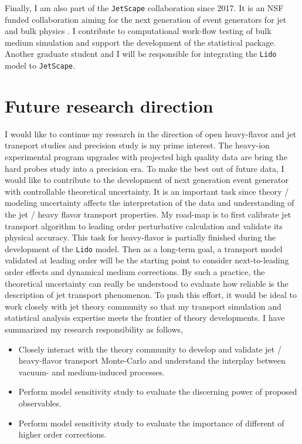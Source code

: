 \documentclass[12pt,a4paper]{revtex4-1}
\begin{document}
Finally, I am also part of the {\tt JetScape} collaboration since 2017. 
It is an NSF funded collaboration aiming for the next generation of event generators for jet and bulk physics \cite{JetScape}. 
I contribute to computational work-flow testing of bulk medium simulation and support the development of the statistical package.
Another graduate student and I will be responsible for integrating the {\tt Lido} model to {\tt JetScape}.

\section*{Future research direction}
I would like to continue my research in the direction of open heavy-flavor and jet transport studies and precision study is my prime interest. 
The heavy-ion experimental program upgrades with projected high quality data are bring the hard probes study into a precision era. 
To make the best out of future data, I would like to contribute to the development of next generation event generator with controllable theoretical uncertainty.
It is an important task since theory / modeling uncertainty affects the interpretation of the data and understanding of the jet / heavy flavor transport properties.
My road-map is to first calibrate jet transport algorithm to leading order perturbative calculation and validate its physical accuracy. 
This task for heavy-flavor is partially finished during the development of the {\tt Lido} model.
Then as a long-term goal, a transport model validated at leading order will be the starting point to consider next-to-leading order effects and dynamical medium corrections.
By such a practice, the theoretical uncertainty can really be understood to evaluate how reliable is the description of jet transport phenomenon.
To push this effort, it would be ideal to work closely with jet theory community so that my transport simulation and statistical analysis expertise meets the frontier of theory developments. 
I have summarized my research responsibility as follows,
\begin{itemize}
\item Closely interact with the theory community to develop and validate jet / heavy-flavor transport Monte-Carlo and understand the interplay between vacuum- and medium-induced processes.
\item Perform model sensitivity study to evaluate the discerning power of proposed observables.
\item Perform model sensitivity study to evaluate the importance of different of higher order corrections.
\end{itemize} 
\end{document}
